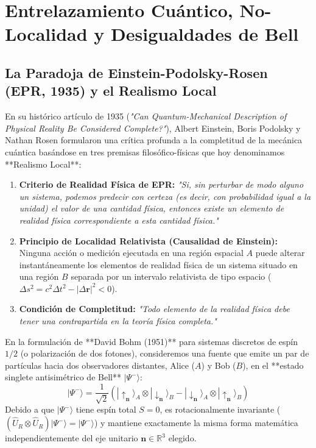 \documentclass[11pt,a4paper]{book}
\begin{document}
\chapter[Entrelazamiento cuántico]{Entrelazamiento Cuántico, No-Localidad y Desigualdades de Bell}

\section[Paradoja EPR y realismo local]{La Paradoja de Einstein-Podolsky-Rosen (EPR, 1935) y el Realismo Local}

En su histórico artículo de 1935 (\textit{"Can Quantum-Mechanical Description of Physical Reality Be Considered Complete?"}), Albert Einstein, Boris Podolsky y Nathan Rosen formularon una crítica profunda a la completitud de la mecánica cuántica basándose en tres premisas filosófico-físicas que hoy denominamos **Realismo Local**:

\begin{enumerate}
    \item \textbf{Criterio de Realidad Física de EPR:} \textit{"Si, sin perturbar de modo alguno un sistema, podemos predecir con certeza (es decir, con probabilidad igual a la unidad) el valor de una cantidad física, entonces existe un elemento de realidad física correspondiente a esta cantidad física."}
    \item \textbf{Principio de Localidad Relativista (Causalidad de Einstein):} Ninguna acción o medición ejecutada en una región espacial $A$ puede alterar instantáneamente los elementos de realidad física de un sistema situado en una región $B$ separada por un intervalo relativista de tipo espacio ($\Delta s^2 = c^2\Delta t^2 - |\Delta\mathbf{r}|^2 < 0$).
    \item \textbf{Condición de Completitud:} \textit{"Todo elemento de la realidad física debe tener una contrapartida en la teoría física completa."}
\end{enumerate}

En la formulación de **David Bohm (1951)** para sistemas discretos de espín $1/2$ (o polarización de dos fotones), consideremos una fuente que emite un par de partículas hacia dos observadores distantes, Alice ($A$) y Bob ($B$), en el **estado singlete antisimétrico de Bell** $|\Psi^-\rangle$:
\begin{equation}
|\Psi^-\rangle = \frac{1}{\sqrt{2}} \left( |\uparrow_{\mathbf{n}}\rangle_A \otimes |\downarrow_{\mathbf{n}}\rangle_B - |\downarrow_{\mathbf{n}}\rangle_A \otimes |\uparrow_{\mathbf{n}}\rangle_B \right)
\end{equation}
Debido a que $|\Psi^-\rangle$ tiene espín total $S=0$, es rotacionalmente invariante ($(\hat{U}_R \otimes \hat{U}_R)|\Psi^-\rangle = |\Psi^-\rangle$) y mantiene exactamente la misma forma matemática independientemente del eje unitario $\mathbf{n} \in \mathbb{R}^3$ elegido.
\end{document}

